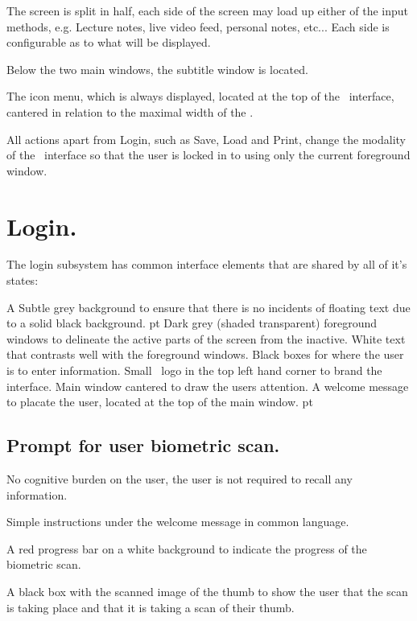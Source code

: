The screen is split in half, each side of the screen may load up either of the input methods, e.g. Lecture notes, live video feed, personal notes, etc... Each side is configurable as to what will be displayed.

Below the two main windows, the subtitle window is located.

The icon menu, which is always displayed, located at the top of the \iDesks\ interface, cantered in relation to the maximal width of the \iDesk.


All actions apart from Login, such as Save, Load and Print, change the modality of the \iDesk\ interface so that the user is locked in to using only the current foreground window.

\section{Login.}

The login subsystem has common interface elements that are shared by all of it's states:

\items A Subtle grey background to ensure that there is no incidents of floating text due to a solid black background.
 pt
\items Dark grey (shaded transparent) foreground windows to delineate the active parts of the screen from the inactive.
\items White text that contrasts well with the foreground windows.
\items Black boxes for where the user is to enter information.
\items Small \UOW\ logo in the top left hand corner to brand the interface.
\items Main window cantered to draw the users attention.
\items A welcome message to placate the user, located at the top of the main window.
 pt

\subsection{Prompt for user biometric scan.}

No cognitive burden on the user, the user is not required to recall any information.

Simple instructions under the welcome message in common language.

A red progress bar on a white background to indicate the progress of the biometric scan.

A black box with the scanned image of the thumb to show the user that the scan is taking place and that it is taking a scan of their thumb.

